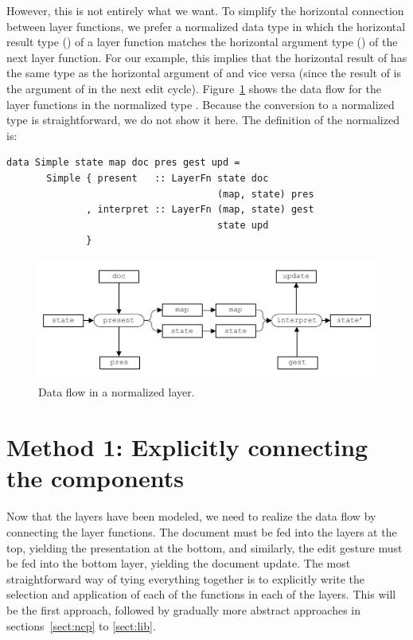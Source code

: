 \documentclass[preprint,natbib]{sigplanconf}
\begin{document}
However, this is not entirely what we want. To simplify the horizontal connection between layer functions, we prefer a normalized data type in which the horizontal result type () of a layer function matches the horizontal argument type () of the next layer function. For our example, this implies that the horizontal result of  has the same type as the horizontal argument of  and vice versa (since the result of  is the argument of  in the next edit cycle). Figure~\ref{wrapped} shows the data flow for the layer functions in the normalized type . Because the conversion to a normalized type is straightforward, we do not show it here. The definition of the normalized  is:

\begin{small}
\begin{verbatim}
data Simple state map doc pres gest upd =
       Simple { present   :: LayerFn state doc 
                                     (map, state) pres
              , interpret :: LayerFn (map, state) gest
                                     state upd
              }
\end{verbatim}
\end{small}

\begin{figure}
\includegraphics[width=\columnwidth]{images/NormalizedLayer}
\caption{Data flow in a normalized layer.}\label{wrapped} 
\end{figure}



%																
%																
%																
\section{Method 1: Explicitly connecting the components} \label{sect:simple}

Now that the layers have been modeled, we need to realize the data flow by connecting the layer functions. The document must be fed into the layers at the top, yielding the presentation at the bottom, and similarly, the edit gesture must be fed into the bottom layer, yielding the document update. The most straightforward way of tying everything together is to explicitly write the selection and application of each of the functions in each of the layers. This will be the first approach, followed by gradually more abstract approaches in sections~\ref{sect:ncp} to \ref{sect:lib}.
\end{document}
